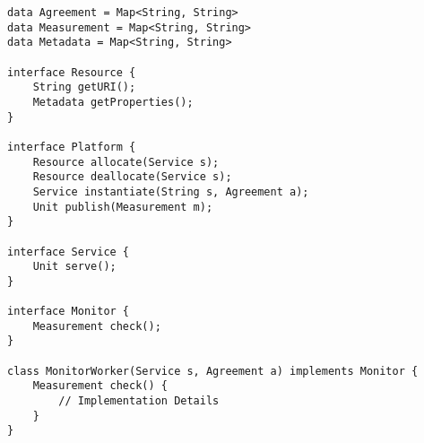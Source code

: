\lstset{language=abs}
\begin{lstlisting}[float=t,caption=Monitoring Model in ABS,label=lst:monitoring]
data Agreement = Map<String, String>
data Measurement = Map<String, String>
data Metadata = Map<String, String>

interface Resource {
	String getURI();
	Metadata getProperties();
}

interface Platform {
	Resource allocate(Service s);
	Resource deallocate(Service s);
	Service instantiate(String s, Agreement a);
	Unit publish(Measurement m);
}

interface Service {
	Unit serve();
}

interface Monitor {
	Measurement check();
}

class MonitorWorker(Service s, Agreement a) implements Monitor {
	Measurement check() {
		// Implementation Details
	}
}
\end{lstlisting}
